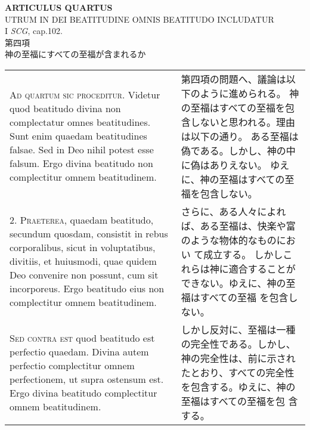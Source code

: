 \documentclass[10pt]{jsarticle} %
\begin{document}
\begin{center}
 {\Large {\bf ARTICULUS QUARTUS}}\\
 {\large UTRUM IN DEI BEATITUDINE OMNIS BEATITUDO INCLUDATUR}\\
 {\footnotesize I {\itshape SCG}, cap.102.}\\
 {\Large 第四項\\神の至福にすべての至福が含まれるか}
\end{center}

\begin{longtable}{p{21em}p{21em}}



{\Huge A}{\scshape d quartum sic proceditur}. Videtur quod beatitudo divina non
complectatur omnes beatitudines. Sunt enim quaedam beatitudines
falsae. Sed in Deo nihil potest esse falsum. Ergo divina beatitudo non
complectitur omnem beatitudinem.


&

第四項の問題へ、議論は以下のように進められる。
神の至福はすべての至福を包含しないと思われる。理由は以下の通り。
ある至福は偽である。しかし、神の中に偽はありえない。
ゆえに、神の至福はすべての至福を包含しない。

\\



2. {\scshape Praeterea}, quaedam beatitudo, secundum quosdam, consistit in rebus
corporalibus, sicut in voluptatibus, divitiis, et huiusmodi, quae quidem
Deo convenire non possunt, cum sit incorporeus. Ergo beatitudo eius non
complectitur omnem beatitudinem.


&

さらに、ある人々によれば、ある至福は、快楽や富のような物体的なものにおい
 て成立する。
しかしこれらは神に適合することができない。ゆえに、神の至福はすべての至福
 を包含しない。


\\



{\scshape Sed contra est} quod beatitudo est perfectio quaedam. Divina autem
perfectio complectitur omnem perfectionem, ut supra ostensum est. Ergo
divina beatitudo complectitur omnem beatitudinem.


&

しかし反対に、至福は一種の完全性である。しかし、神の完全性は、前に示され
 たとおり、すべての完全性を包含する。ゆえに、神の至福はすべての至福を包
 含する。

\\



\end{longtable}
\end{document}
